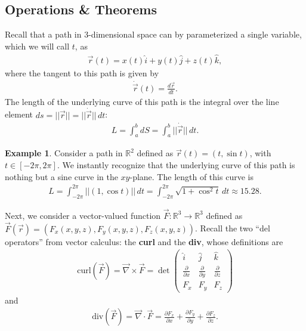 \documentclass{article}
\theoremstyle{definition}
\newtheorem{exmp}{Example}[section]
\begin{document}
\subsection{Operations \& Theorems}
Recall that a path in 3-dimensional space can by parameterized a single variable, which we will call $t$, as
\begin{align*}
\vec{r}(t) = x(t)\hat{i} + y(t)\hat{j} + z(t)\hat{k},
\end{align*}
where the tangent to this path is given by
\begin{align*}
\dot{\vec{r}}(t) = \frac{d \vec{r}}{dt}.
\end{align*}
The length of the underlying curve of this path is the integral over the line element $ds = \vert\vert \vec{r} \vert\vert = \vert\vert \dot{\vec{r}} \vert\vert\,dt$:
\begin{align*}
L = \int_{a}^{b} dS = \int_{a}^{b} \vert\vert \dot{\vec{r}} \vert\vert\,dt.
\end{align*} 
\begin{exmp}
Consider a path in $\mathbb{R}^2$ defined as $\vec{r}(t) = (t, \sin t)$, with $t \in [-2\pi, 2\pi]$. We instantly recognize that the underlying curve of this path is nothing but a sine curve in the $xy$-plane. The length of this curve is
\begin{align*}
L = \int_{-2\pi}^{2\pi}\vert\vert  (1,\cos t)\vert\vert\,dt  = \int_{-2\pi}^{2\pi} \sqrt{1+\cos^2 t}\,dt \approx 15.28.
\end{align*}
\end{exmp}
Next, we consider a vector-valued function $\vec{F} : \mathbb{R}^3 \rightarrow \mathbb{R}^3$ defined as $\vec{F}(\vec{r}) = (F_x(x,y,z), F_y(x,y,z),F_z(x,y,z))$. Recall the two ``del operators'' from vector calculus: the \textbf{curl} and the \textbf{div}, whose definitions are
\begin{align*}
\text{curl}(\vec{F}) = \vec{\nabla} \times \vec{F} = \det
\begin{pmatrix}
\hat{i} & \hat{j} & \hat{k} \\
\frac{\partial}{\partial x} & \frac{\partial }{\partial y} & \frac{\partial}{\partial z}\\
F_x & F_y & F_z
\end{pmatrix}
\end{align*}
and 
\begin{align*}
\text{div}(\vec{F}) = \vec{\nabla} \cdot \vec{F} = 
\frac{\partial F_x}{\partial x} + \frac{\partial F_y }{\partial y} + \frac{\partial F_z}{\partial z}.
\end{align*}
\end{document}
